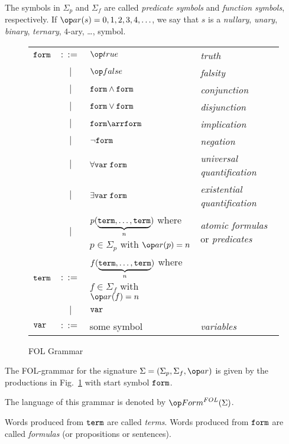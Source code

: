 The symbols in $\Sigma_p$ and $\Sigma_f$ are called \emph{predicate symbols} and \emph{function symbols}, respectively. If $\arit(s)=0,1,2,3,4,\ldots$, we say that $s$ is a \emph{nullary}, \emph{unary}, \emph{binary}, \emph{ternary}, $4$-ary, \ldots, symbol.

\begin{figure}[htp]
\begin{center}
\begin{tabular}{lcl@{\tb}l}
$\mathtt{form}$ & $::=$ & $\true$ & \emph{truth} \\
        &  $|$  & $\false$ & \emph{falsity} \\
        &  $|$  & $\mathtt{form} \wedge \mathtt{form}$ & \emph{conjunction} \\
        &  $|$  & $\mathtt{form} \vee \mathtt{form}$ & \emph{disjunction} \\
        &  $|$  & $\FORM \arr \FORM$ & \emph{implication} \\
        &  $|$  & $\neg \mathtt{form}$ & \emph{negation} \\
        &  $|$  & $\forall \mathtt{var}\; \mathtt{form}$ & \emph{universal quantification} \\
        &  $|$  & $\exists \mathtt{var}\; \mathtt{form}$ & \emph{existential quantification} \\
        &  $|$  & $p(\underbrace{\mathtt{term},\ldots,\mathtt{term}}_n)$ where $p\in\Sigma_p$ with $\arit(p)=n$ & \emph{atomic formulas} or \emph{predicates}\\
$\mathtt{term}$ & $::=$ & $f(\underbrace{\mathtt{term},\ldots,\mathtt{term}}_n)$ where $f\in\Sigma_f$ with $\arit(f)=n$ \\
        &  $|$  & $\mathtt{var}$ &\\
$\mathtt{var}$  & $::=$ & some symbol & \emph{variables}
\end{tabular}
\caption{FOL Grammar}\label{fig:fol:grammar}
\end{center}
\end{figure}

\begin{definition}\label{def:fol:grammar}
The FOL-grammar for the signature $\Sigma=(\Sigma_p,\Sigma_f,\arit)$ is given by the productions in Fig.~\ref{fig:fol:grammar} with start symbol $\mathtt{form}$.

The language of this grammar is denoted by $\Forms^{FOL}(\Sigma)$.
\end{definition}

Words produced from $\mathtt{term}$ are called \emph{terms}.
Words produced from $\mathtt{form}$ are called \emph{formulas} (or propositions or sentences).

